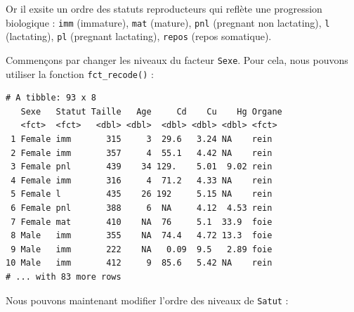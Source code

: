 \documentclass[a4paperpaper,]{article}
\newenvironment{Shaded}{\begin{snugshade}}{\end{snugshade}}
\newcommand{\KeywordTok}[1]{\textcolor[rgb]{0.13,0.29,0.53}{\textbf{#1}}}
\newcommand{\DataTypeTok}[1]{\textcolor[rgb]{0.13,0.29,0.53}{#1}}
\newcommand{\StringTok}[1]{\textcolor[rgb]{0.31,0.60,0.02}{#1}}
\newcommand{\OperatorTok}[1]{\textcolor[rgb]{0.81,0.36,0.00}{\textbf{#1}}}
\newcommand{\NormalTok}[1]{#1}
\theoremstyle{definition}
\theoremstyle{definition}
\theoremstyle{definition}
\theoremstyle{remark}
\begin{document}
Or il exsite un ordre des statuts reproducteurs qui reflète une
progression biologique : \texttt{imm} (immature), \texttt{mat} (mature),
\texttt{pnl} (pregnant non lactating), \texttt{l} (lactating),
\texttt{pl} (pregnant lactating), \texttt{repos} (repos somatique).

Commençons par changer les niveaux du facteur \texttt{Sexe}. Pour cela,
nous pouvons utiliser la fonction \texttt{fct\_recode()} :

\begin{Shaded}
\end{Shaded}

\begin{verbatim}
# A tibble: 93 x 8
   Sexe   Statut Taille   Age     Cd    Cu    Hg Organe
   <fct>  <fct>   <dbl> <dbl>  <dbl> <dbl> <dbl> <fct> 
 1 Female imm       315     3  29.6   3.24 NA    rein  
 2 Female imm       357     4  55.1   4.42 NA    rein  
 3 Female pnl       439    34 129.    5.01  9.02 rein  
 4 Female imm       316     4  71.2   4.33 NA    rein  
 5 Female l         435    26 192     5.15 NA    rein  
 6 Female pnl       388     6  NA     4.12  4.53 rein  
 7 Female mat       410    NA  76     5.1  33.9  foie  
 8 Male   imm       355    NA  74.4   4.72 13.3  foie  
 9 Male   imm       222    NA   0.09  9.5   2.89 foie  
10 Male   imm       412     9  85.6   5.42 NA    rein  
# ... with 83 more rows
\end{verbatim}

Nous pouvons maintenant modifier l'ordre des niveaux de \texttt{Satut} :

\begin{Shaded}
\end{Shaded}
\end{document}
